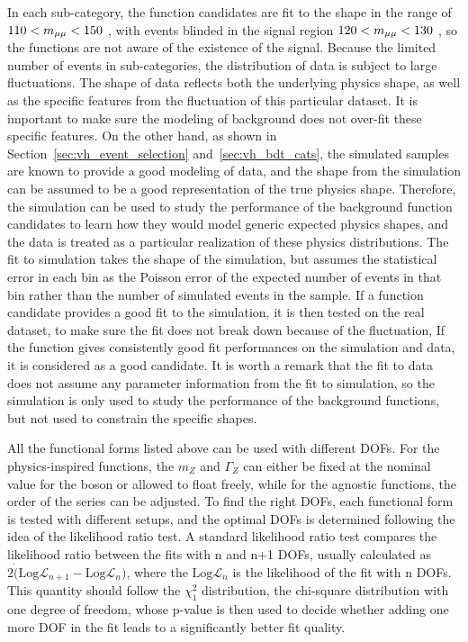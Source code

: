 In each sub-category, the function candidates are fit to the \mmm shape in the range of $110 < m_{\mu\mu} < 150$ \GeV, 
with events blinded in the signal region $120 < m_{\mu\mu} < 130$ \GeV, so the functions are not aware of the existence of the signal.
Because the limited number of events in \VH sub-categories, the distribution of data is subject to large fluctuations.
The \mmm shape of data reflects both the underlying physics shape, as well as the specific features from the fluctuation of this particular dataset.
It is important to make sure the modeling of background does not over-fit these specific features.
On the other hand, as shown in Section~\ref{sec:vh_event_selection} and~\ref{sec:vh_bdt_cats}, 
the simulated samples are known to provide a good modeling of data,   
and the \mmm shape from the simulation can be assumed to be a good representation of the true physics shape.
Therefore, the simulation can be used to study the performance of the background function candidates 
to learn how they would model generic expected physics shapes,
and the data is treated as a particular realization of these physics distributions.
The fit to simulation takes the \mmm shape of the simulation,
but assumes the statistical error in each bin as the Poisson error of the expected number of events in that bin rather than the number of simulated events in the sample.
If a function candidate provides a good fit to the simulation, it is then tested on the real dataset, 
to make sure the fit does not break down because of the fluctuation, 
If the function gives consistently good fit performances on the simulation and data, it is considered as a good candidate.
It is worth a remark that the fit to data does not assume any parameter information from the fit to simulation,
so the simulation is only used to study the performance of the background functions, but not used to constrain the specific shapes.

All the functional forms listed above can be used with different DOFs.
For the physics-inspired functions, the $m_{Z}$ and $\Gamma_{Z}$ can either be fixed at the nominal value for the \PZ boson or allowed to float freely,
while for the agnostic functions, the order of the series can be adjusted.
To find the right DOFs, each functional form is tested with different setups,
and the optimal DOFs is determined following the idea of the likelihood ratio test.
A standard likelihood ratio test compares the likelihood ratio between the fits with n and n+1 DOFs, 
usually calculated as $2\dot(\mathrm{Log}\mathcal{L}_{n+1}-\mathrm{Log}\mathcal{L}_{n})$, 
where the $\mathrm{Log}\mathcal{L}_{n}$ is the likelihood of the fit with n DOFs.
This quantity should follow the $\chi^{2}_{1}$ distribution, the chi-square distribution with one degree of freedom, 
whose p-value is then used to decide whether adding one more DOF in the fit leads to a significantly better fit quality.

